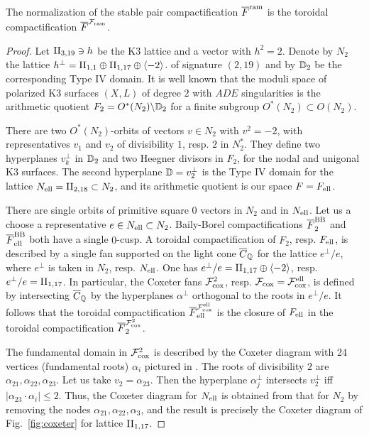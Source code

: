\documentclass[table,x11names]{amsart}
\begin{document}
\begin{theorem}\label{thm:ramif-comp}
  The normalization of the stable pair compactification ${\overline F}^{{\rm ram}}$ is
  the toroidal compactification ${\overline F}^{{\mathcal F}_{\rm ram}}$. 
\end{theorem}
\begin{proof}
  Let $\II_{3,19}\ni h$ be the K3 lattice and a vector with $h^2=2$.
  Denote by $N_2$ the lattice
 $h^\perp = \II_{1,1} \oplus \II_{1,17} \oplus \la -2\ra$.  of signature
  $(2,19)$ and by ${\mathbb D}_2$ be the corresponding Type IV domain. It is
  well known that the moduli space of polarized K3 surfaces $(X,L)$ of
  degree $2$ with $ADE$ singularities is the arithmetic quotient
  $F_2 = O^*(N_2)\backslash{\mathbb D}_2$ for a finite subgroup
  $O^*(N_2)\subset O(N_2)$.

  There are two $O^*(N_2)$-orbits of vectors $v\in N_2$ with $v^2=-2$,
  with representatives $v_1$ and $v_2$ of divisibility $1$,
  resp. $2$ in $N_2^*$. They define two hyperplanes $v_k^\perp$ in ${\mathbb D}_2$ and
  two Heegner divisors in $F_2$, for the nodal and unigonal K3
  surfaces. The second hyperplane ${\mathbb D}=v_2^\perp$ is the Type IV
  domain for the lattice $N_\el = \II_{2,18} \subset N_2$,
  and its arithmetic quotient is our space $F=F_{\operatorname{ell}}$.

  There are single orbits of primitive square $0$ vectors in $N_2$ and in
  $N_{\operatorname{ell}}$. Let us a choose a representative $e\in N_{\operatorname{ell}}\subset N_2$.
  Baily-Borel compactifications ${\overline F}_2^{\rm BB}$ and ${\overline F}_{\operatorname{ell}}^{\rm BB}$ both have a
  single $0$-cusp.  A toroidal compactification of $F_2$,
  resp. $F_{\operatorname{ell}}$, is described by a single fan supported on the light
  cone ${\overline C}_{\mathbb Q}$ for the lattice $e^\perp/e$, where $e^\perp$ is taken
  in $N_2$, resp. $N_{\operatorname{ell}}$. One has
  $e^\perp/e = \II_{1,17}\oplus\la -2\ra$, resp.
  $e^\perp/e = \II_{1,17}$.  In particular, the Coxeter fans
  ${\mathcal F}^2_{\rm cox}$, resp. ${\mathcal F}_{\rm cox} = {\mathcal F}^{\operatorname{ell}}_{\rm cox}$, is defined by intersecting
  ${\overline C}_{\mathbb Q}$ by the hyperplanes $\alpha^\perp$ orthogonal to the roots
  in $e^\perp/e$. It follows that the toroidal compactification
  ${\overline F}_{\operatorname{ell}}^{{\mathcal F}^{\operatorname{ell}}_{\rm cox}}$ is the closure of $F_{\operatorname{ell}}$ in the toroidal
  compactification ${\overline F}_2^{{\mathcal F}^2_{\rm cox}}$. 

  The fundamental domain in ${\mathcal F}^2_{\rm cox}$ is described by the Coxeter
  diagram with 24 vertices (fundamental roots) $\alpha_i$ pictured in
  \cite[Fig. 4.1]{alexeev2019stable-pair}. The roots of divisibility
  $2$ are $\alpha_{21}, \alpha_{22}, \alpha_{23}$. Let us take
  $v_2=\alpha_{23}$. Then the hyperplane $\alpha_j^\perp$ intersects
  $v_2^\perp$ iff $|\alpha_{23} \cdot \alpha_i| \le 2$. Thus, the
  Coxeter diagram for $N_{\operatorname{ell}}$ is obtained from that for $N_2$ by
  removing the nodes $\alpha_{21}, \alpha_{22}, \alpha_3$, and the
  result is precisely the Coxeter diagram of Fig.~\ref{fig:coxeter}
  for lattice $\II_{1,17}$. 


\end{proof}
\end{document}
